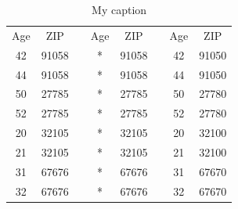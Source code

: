 \documentclass{llncs}
\begin{document}
\begin{table}[]
	\centering
	\caption{My caption}
	\label{my-label}
	\begin{tabular}{@{}cccccccc@{}}
		\cmidrule(r){1-2} \cmidrule(lr){4-5} \cmidrule(l){7-8}
		Age & ZIP   &  & Age & ZIP   &  & Age & ZIP   \\ \cmidrule(r){1-2} \cmidrule(lr){4-5} \cmidrule(l){7-8} 
		42  & 91058 &  & *   & 91058 &  & 42  & 91050 \\
		44  & 91058 &  & *   & 91058 &  & 44  & 91050 \\
		50  & 27785 &  & *   & 27785 &  & 50  & 27780 \\
		52  & 27785 &  & *   & 27785 &  & 52  & 27780 \\
		20  & 32105 &  & *   & 32105 &  & 20  & 32100 \\
		21  & 32105 &  & *   & 32105 &  & 21  & 32100 \\
		31  & 67676 &  & *   & 67676 &  & 31  & 67670 \\
		32  & 67676 &  & *   & 67676 &  & 32  & 67670 \\ \cmidrule(r){1-2} \cmidrule(lr){4-5} \cmidrule(l){7-8} 
	\end{tabular}
\end{table}
\end{document}
